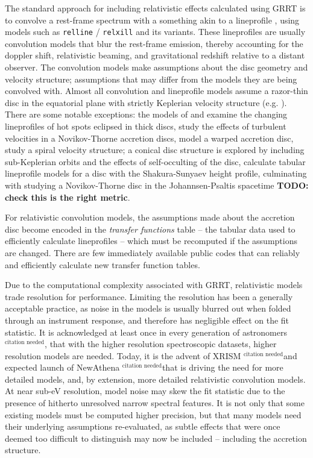 \documentclass[fleqn,usenatbib]{mnras}
\newcommand{\citneeded}{{\bf \color{red} $^{\text{citation needed}}$}}
\newcommand{\todo}[1]{{\noindent \bf \color{red} TODO: #1}}
\begin{document}
The standard approach for including relativistic effects calculated using GRRT
is to convolve a rest-frame spectrum with a something akin to a lineprofile
\citep{fabian_x-ray_1989, laor_line_1991}, using models such as \texttt{relline}
/ \texttt{relxill} \citep{dauser_broad_2010, dauser_relativistic_2016}  and its
variants. These lineprofiles are usually convolution models that blur the
rest-frame emission, thereby accounting for the doppler shift, relativistic
beaming, and gravitational redshift relative to a distant observer. The
convolution models make assumptions about the disc geometry and velocity
structure; assumptions that may differ from the models they are being convolved
with. Almost all convolution and lineprofile models assume a razor-thin
disc in the equatorial plane with strictly Keplerian velocity structure (e.g.
\citealt{dovciak_extended_2004, beckwith_iron_2004, brenneman_constraining_2006,
dauser_broad_2010}).
There are some notable exceptions:
the models of \cite{karas_light_1992} and \cite{karas_vicinity_1992} examine the
changing lineprofiles of hot spots
eclipsed in thick discs, \cite{pariev_line_1998} study the effects of
turbulent velocities in a Novikov-Thorne accretion discs,
\cite{hartnoll_reprocessed_2001} model a warped accretion disc,
\cite{fukumura_iron_2004} study a spiral velocity structure; a conical disc
structure is explored by \cite{wu_iron_2007} including sub-Keplerian orbits and the effects of
self-occulting of the disc,
\cite{taylor_exploring_2018} calculate tabular lineprofile models for a disc
with the
Shakura-Sunyaev height profile, culminating with \cite{abdikamalov_testing_2020}
studying a Novikov-Thorne disc in the Johannsen-Psaltis spacetime  \todo{check
this is the right metric}.

For relativistic convolution models, the assumptions made about the accretion
disc become encoded in the \textit{transfer functions} table -- the tabular data
used to efficiently calculate lineprofiles -- which must be recomputed if the
assumptions are changed. There are few immediately available public codes that
can reliably and efficiently calculate new transfer function tables.

Due to the computational complexity associated with GRRT, relativistic models
trade resolution for performance. Limiting the resolution has been a generally
acceptable practice, as noise in the models is usually blurred out when folded
through an instrument response, and therefore has negligible effect on the fit
statistic. It is acknowledged at least once in every generation of
astronomers\citneeded, that with the higher resolution spectroscopic datasets,
higher resolution models are needed. Today, it is the advent of XRISM\citneeded and
expected launch of NewAthena \citneeded that is driving the need for more
detailed models, and, by extension, more detailed relativistic convolution
models. At near sub-eV resolution, model noise may skew the fit statistic due to
the presence of hitherto unresolved narrow spectral features. It is not only
that some existing models must be computed higher precision, but that many
models need their underlying assumptions re-evaluated, as subtle effects that
were once deemed too difficult to distinguish may now be included -- including
the accretion structure.
\end{document}
